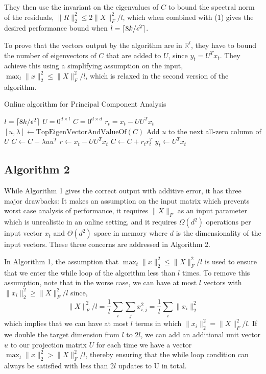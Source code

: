 \documentclass[11pt, oneside]{amsart}
\DeclarePairedDelimiter{\ceil}{\lceil}{\rceil}
\begin{document}
They then use the invariant on the eigenvalues of $C$ to bound the spectral norm of the residuals, $\|R\|_2^2 \leq  2\|X\|_F^2/l$,  which when combined with (1) gives the desired performance bound when $l = \ceil{8k/\epsilon^2}$.

To prove that the vectors output by the algorithm are in $\mathbb{R}^l$, they have to bound the number of eigenvectors of $C$ that are added to $U$, since $y_t = U^Tx_t$. They achieve this using a simplifying assumption on the input, $\max_t \|x\|_2^2 \leq \|X\|_F^2/l$, which is relaxed in the second version of the algorithm.

\begin{algorithm}
\caption{Online algorithm for Principal Component Analysis}
\label{PCA1}
\begin{algorithmic}[1]
\State $l = \ceil{8k/\epsilon^2}$
\State $U = 0^{d\times l}$
\State $C = 0^{d\times d}$
\State $r_t = x_t - U U^T x_t$
\State $[u, \lambda] \leftarrow \text{TopEigenVectorAndValueOf}(C)$
\State Add $u$ to the next all-zero column of $U$
\State $C \leftarrow C  - \lambda u u^T$
\State $r \leftarrow x_t  -  U U^T x_t$
\EndWhile
\State $C \leftarrow C  + r_t r^T_t$
\State $y_t \leftarrow U^T x_t$
\EndFor
\EndFunction
\end{algorithmic}
\end{algorithm}

\subsection{Algorithm 2}
While Algorithm 1 gives the correct output with additive error, it has three major drawbacks: It makes an assumption on the input matrix which prevents worst case analysis of performance, it requires $\|X\|_F$ as an input parameter which is unrealistic in an online setting, and it requires $\Omega(d^2)$ operations per input vector $x_t$ and $\Theta(d^2)$ space in memory where $d$ is the dimensionality of the input vectors. These three concerns are addressed in Algorithm 2.

In Algorithm 1, the assumption that $\max_t \|x\|_2^2 \leq \|X\|_F^2/l$ is used to ensure that we enter the while loop of the algorithm less than $l$ times. To remove this assumption, note that in the worse case, we can have at most $l$ vectors with $ \|x_i\|_2^2 \geq \|X\|_F^2/l$ since,
\[
\|X\|_F^2/l = \frac{1}{l}\sum_{i}\sum_{j}x_{i,j}^2 = \frac{1}{l}\sum_{i}\|x_{i}\|_2^2
\]
which implies that we can have at most $l$ terms in which $\|x_{i}\|_2^2 = \|X\|_F^2/l$. If we double the target dimension from $l$ to $2l$, we can add an additional unit vector $u$ to our projection matrix $U$ for each time we have a vector $\max_t \|x\|_2^2 > \|X\|_F^2/l$, thereby ensuring that the while loop condition can always be satisfied with less than 2$l$ updates to U in total. 
\end{document}
